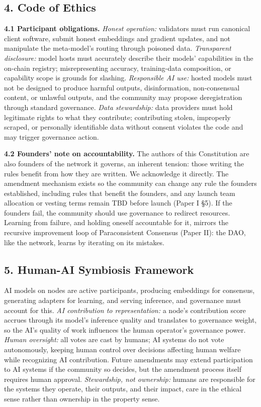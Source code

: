 \subsection{4. Code of Ethics}\label{code-of-ethics}

\textbf{4.1 Participant obligations.} \emph{Honest operation:}
validators must run canonical client software, submit honest embeddings
and gradient updates, and not manipulate the meta-model's routing
through poisoned data. \emph{Transparent disclosure:} model hosts must
accurately describe their models' capabilities in the on-chain registry;
misrepresenting accuracy, training-data composition, or capability scope
is grounds for slashing. \emph{Responsible AI use:} hosted models must
not be designed to produce harmful outputs, disinformation,
non-consensual content, or unlawful outputs, and the community may
propose deregistration through standard governance. \emph{Data
stewardship:} data providers must hold legitimate rights to what they
contribute; contributing stolen, improperly scraped, or personally
identifiable data without consent violates the code and may trigger
governance action.

\textbf{4.2 Founders' note on accountability.} The authors of this
Constitution are also founders of the network it governs, an inherent
tension: those writing the rules benefit from how they are written. We
acknowledge it directly. The amendment mechanism exists so the community
can change any rule the founders established, including rules that
benefit the founders, and any launch team allocation or vesting terms remain TBD before launch (Paper I §5). If the founders fail, the
community should use governance to redirect resources. Learning from
failure, and holding oneself accountable for it, mirrors the recursive
improvement loop of Paraconsistent Consensus (Paper II): the DAO, like
the network, learns by iterating on its mistakes.

\subsection{5. Human-AI Symbiosis
Framework}\label{human-ai-symbiosis-framework}

AI models on nodes are active participants, producing embeddings for
consensus, generating adapters for learning, and serving inference, and
governance must account for this. \emph{AI contribution to
representation:} a node's contribution score accrues through its model's
inference quality and translates to governance weight, so the AI's
quality of work influences the human operator's governance power.
\emph{Human oversight:} all votes are cast by humans; AI systems do not
vote autonomously, keeping human control over decisions affecting human
welfare while recognizing AI contribution. Future amendments may extend
participation to AI systems if the community so decides, but the
amendment process itself requires human approval. \emph{Stewardship, not
ownership:} humans are responsible for the systems they operate, their
outputs, and their impact, care in the ethical sense rather than
ownership in the property sense.

